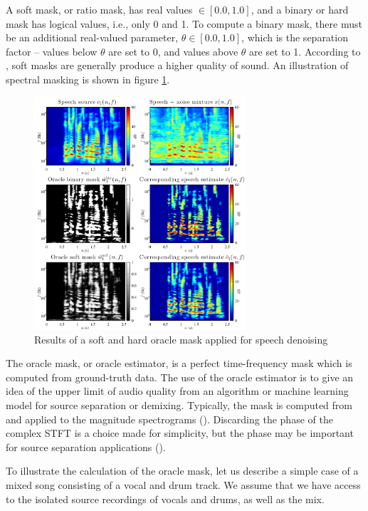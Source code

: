 \documentclass[report.tex]{subfiles}
\begin{document}
A soft mask, or ratio mask, has real values $\in [0.0, 1.0]$, and a binary or hard mask has logical values, i.e., only 0 and 1. To compute a binary mask, there must be an additional real-valued parameter, $\theta \in [0.0, 1.0]$, which is the separation factor -- values below $\theta$ are set to 0, and values above $\theta$ are set to 1. According to \textcite{masking}, soft masks are generally produce a higher quality of sound. An illustration of spectral masking is shown in figure \ref{fig:masks}.

\begin{figure}[ht]
	\centering
	\includegraphics[width=0.7\textwidth]{./images-mss/maskdemo.png}
	\caption{Results of a soft and hard oracle mask applied for speech denoising}
	\label{fig:masks}
\end{figure}

The oracle mask, or oracle estimator, is a perfect time-frequency mask which is computed from ground-truth data. The use of the oracle estimator is to give an idea of the upper limit of audio quality from an algorithm or machine learning model for source separation or demixing. Typically, the mask is computed from and applied to the magnitude spectrograms (\cite{fitzgerald1, fitzgerald2, driedger, umx, plumbley1, plumbley2}). Discarding the phase of the complex STFT is a choice made for simplicity, but the phase may be important for source separation applications (\cite{ditchphase}).

To illustrate the calculation of the oracle mask, let us describe a simple case of a mixed song consisting of a vocal and drum track. We assume that we have access to the isolated source recordings of vocals and drums, as well as the mix.
\end{document}
